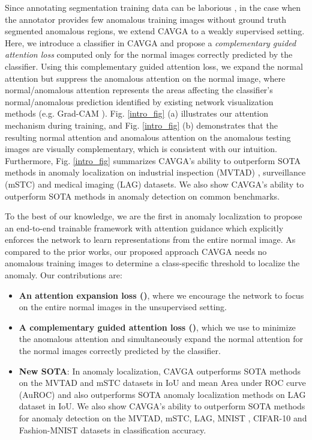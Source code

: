 \documentclass[runningheads]{llncs}
\begin{document}
Since annotating segmentation training data can be laborious \cite{Kimura_2020_WACV}, in the case when the annotator provides few anomalous training images without ground truth segmented anomalous regions, we extend CAVGA to a weakly supervised setting. Here, we introduce a classifier in CAVGA and propose a \textit{complementary guided attention loss} computed only for the normal images correctly predicted by the classifier. Using this complementary guided attention loss, we expand the normal attention but suppress the anomalous attention on the normal image, where normal/anomalous attention represents the areas affecting the classifier's normal/anomalous prediction identified by existing network visualization methods (e.g. Grad-CAM \cite{selvaraju2017grad}). Fig. \ref{intro_fig}  (a) illustrates our attention mechanism during training, and Fig. \ref{intro_fig}  (b) demonstrates that the resulting normal attention and anomalous attention on the anomalous testing images are visually complementary, which is consistent with our intuition. Furthermore, Fig. \ref{intro_fig}  summarizes CAVGA's ability to outperform SOTA methods in anomaly localization on industrial inspection (MVTAD) \cite{bergmann2019mvtec}, surveillance (mSTC) \cite{liu2018future} and medical imaging (LAG) \cite{Li_2019_CVPR} datasets. We also show CAVGA's ability to outperform SOTA methods in anomaly detection on common benchmarks.

To the best of our knowledge, we are the first in anomaly localization to propose an end-to-end trainable framework with attention guidance which explicitly enforces the network to learn representations from the entire normal image. As compared to the prior works, our proposed approach CAVGA needs no anomalous training images to determine a class-specific threshold to localize the anomaly. Our contributions are:
\begin{itemize}
    \item \textbf{An attention expansion loss (\boldmath{})}, where we encourage the network to focus on the entire normal images in the unsupervised setting.
    \item \textbf{A complementary guided attention loss (\boldmath{})}, which we use to minimize the anomalous attention and simultaneously expand the normal attention for the normal images correctly predicted by the classifier.  
    \item \textbf{New SOTA}: In anomaly localization, CAVGA outperforms SOTA methods on the MVTAD and mSTC datasets in IoU and mean Area under ROC curve (AuROC) and also outperforms SOTA anomaly localization methods on LAG dataset in IoU. We also show CAVGA's ability to outperform SOTA methods for anomaly detection on the MVTAD, mSTC, LAG, MNIST \cite{lecun1998gradient}, CIFAR-10 \cite{krizhevsky2009learning} and Fashion-MNIST \cite{xiao2017fashion} datasets in classification accuracy. 
\end{itemize}
\end{document}

